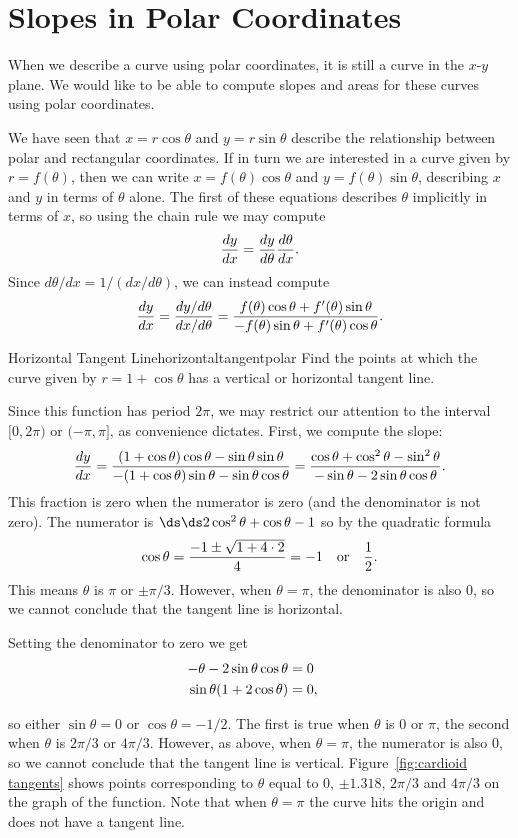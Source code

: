 \section{Slopes in Polar Coordinates}\label{sec:Slopes in polar coordinates}
When we describe a curve using polar coordinates, it is still a curve
in the $x$-$y$ plane. We would like to be able to compute slopes and
areas for these curves using polar coordinates.

We have seen that $x=r\cos\theta$ and $y=r\sin\theta$ describe the
relationship between polar and rectangular coordinates. If in turn we
are interested in a curve given by $r=f(\theta)$, then we can write
$x=f(\theta)\cos\theta$ and $y=f(\theta)\sin\theta$, describing $x$
and $y$ in terms of $\theta$ alone. The first of these equations
describes $\theta$ implicitly in terms of $x$, so using the chain rule
we may compute
$${dy\over dx}={dy\over d\theta}{d\theta\over dx}.$$
Since $d\theta/dx=1/(dx/d\theta)$, we can instead compute
$$
  {dy\over dx}={dy/d\theta\over dx/d\theta}=
  {f(\theta)\cos\theta + f'(\theta)\sin\theta\over
  -f(\theta)\sin\theta + f'(\theta)\cos\theta}.
$$

\begin{example}{Horizontal Tangent Line}{horizontaltangentpolar}
 Find the points at which the curve given by
$r=1+\cos\theta$ has a vertical or horizontal tangent line. 
\end{example}

\begin{solution}
Since this function has period $2\pi$, we may restrict our attention to the
interval $[0,2\pi)$ or $(-\pi,\pi]$, as convenience dictates.
First, we compute the slope:
$$
  {dy\over dx}={(1+\cos\theta)\cos\theta-\sin\theta\sin\theta\over
    -(1+\cos\theta)\sin\theta-\sin\theta\cos\theta}=
  {\cos\theta+\cos^2\theta-\sin^2\theta\over
    -\sin\theta-2\sin\theta\cos\theta}.
$$
This fraction is zero when the numerator is zero (and the denominator
is not zero). The numerator is $\ds \ds 2\cos^2\theta+\cos\theta-1$ so by the
quadratic formula
$$
  \cos\theta={-1\pm\sqrt{1+4\cdot2}\over 4} = -1 
  \quad\hbox{or}\quad {1\over 2}.
$$
This means $\theta$ is $\pi$ or $\pm \pi/3$.
However, when $\theta=\pi$, the denominator is
also $0$, so we cannot conclude that the tangent line is horizontal. 

Setting the denominator to zero we get
\begin{eqnarray*}
  -\theta-2\sin\theta\cos\theta &= 0\cr
  \sin\theta(1+2\cos\theta)&=0,\cr
\end{eqnarray*}

so either $\sin\theta=0$ or $\cos\theta=-1/2$. The first is true when
$\theta$ is $0$ or $\pi$, the second when $\theta$ is $2\pi/3$ or
$4\pi/3$. However, as above, when $\theta=\pi$, the numerator is also $0$, so we
cannot conclude that the tangent line is
vertical. Figure~\ref{fig:cardioid tangents} shows points
corresponding to $\theta$ equal to $0$, $\pm 1.318$, $2\pi/3$ and
$4\pi/3$ on the graph of the function. Note that when $\theta=\pi$ the
curve hits the origin and does not have a tangent line.
\end{solution}

